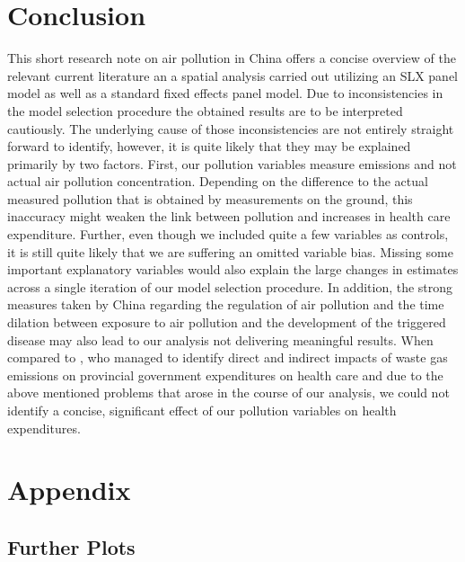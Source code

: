 \documentclass[
]{article}
\begin{document}
	\section{Conclusion} \label{Conclusion}

	This short research note on air pollution in China offers a concise overview of the relevant current literature an a spatial analysis carried out utilizing an SLX panel model as well as a standard fixed effects panel model. Due to inconsistencies in the model selection procedure the obtained results are to be interpreted cautiously. The underlying cause of those inconsistencies are not entirely straight forward to identify, however, it is quite likely that they may be explained primarily by two factors. First, our pollution variables measure emissions and not actual air pollution concentration. Depending on the difference to the actual measured pollution that is obtained by measurements on the ground, this inaccuracy might weaken the link between pollution and increases in health care expenditure. Further, even though we included quite a few variables as controls, it is still quite likely that we are suffering an omitted variable bias. Missing some important explanatory variables would also explain the large changes in estimates across a single iteration of our model selection procedure. In addition, the strong measures taken by China regarding the regulation of air pollution and the time dilation between exposure to air pollution and the development of the triggered disease may also lead to our analysis not delivering meaningful results.
	When compared to \cite{zeng2019does}, who managed to identify direct and indirect impacts of waste gas emissions on provincial government expenditures on health care and due to the above mentioned problems that arose in the course of our analysis, we could not identify a concise, significant effect of our pollution variables on health expenditures.


	\newpage
	\printbibliography[heading=bibintoc]
	\newpage
	\appendix
	\section{Appendix}
	\subsection{Further Plots}
\end{document}

